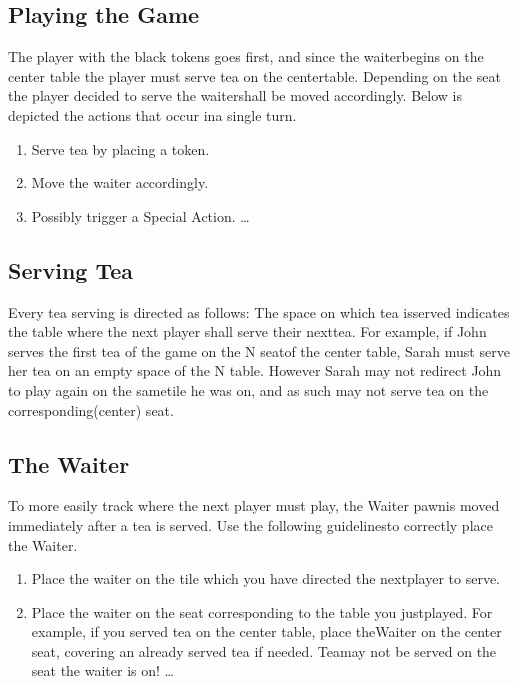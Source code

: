 \documentclass[a4paper]{article}
\begin{document}
\subsection{Playing​ ​the​ ​Game}
The​ ​player​ ​with​ ​the​ ​black​ ​tokens​ ​goes​ ​first,​ ​and​ ​since​ ​the​ ​waiter​ ​begins​ ​on​ ​the​ ​center​ ​table
the​ ​player​ ​must​ ​serve​ ​tea​ ​on​ ​the​ ​center​ ​table.​ ​Depending​ ​on​ ​the​ ​seat​ ​the​ ​player​ ​decided​ ​to​ ​serve
the​ ​waiter​ ​shall​ ​be​ ​moved​ ​accordingly.​ ​Below​ ​is​ ​depicted​ ​the​ ​actions​ ​that​ ​occur​ ​in​ ​a​ ​single​ ​turn.
\begin{enumerate}
\item Serve​ ​tea​ ​by​ ​placing​ ​a​ ​token.
\item Move​ ​the​ ​waiter​ ​accordingly.
\item Possibly​ ​trigger​ ​a​ ​Special​ ​Action. \ldots
\end{enumerate}

\subsection{Serving​ ​Tea}
Every​ ​tea​ ​serving​ ​is​ ​directed​ ​as​ ​follows:​ ​The​ ​space​ ​on​ ​which​ ​tea​ ​is​ ​served​ ​indicates​ ​the
table​ ​where​ ​the​ ​next​ ​player​ ​shall​ ​serve​ ​their​ ​next​ ​tea.​ ​For​ ​example,​ ​if​ ​John​ ​serves​ ​the​ ​first​ ​tea​ ​of
the​ ​game​ ​on​ ​the​ ​N​ ​seat​ ​of​ ​the​ ​center​ ​table,​ ​Sarah​ ​must​ ​serve​ ​her​ ​tea​ ​on​ ​an​ ​empty​ ​space​ ​of​ ​the​ ​N
table.​ ​However​ ​Sarah​ ​may​ ​not​ ​redirect​ ​John​ ​to​ ​play​ ​again​ ​on​ ​the​ ​same​ ​tile​ ​he​ ​was​ ​on,​ ​and​ ​as​ ​such
may​ ​not​ ​serve​ ​tea​ ​on​ ​the​ ​corresponding​ ​(center)​ ​seat.

\subsection{The​ ​Waiter}
To​ ​more​ ​easily​ ​track​ ​where​ ​the​ ​next​ ​player​ ​must​ ​play,​ ​the​ ​Waiter​ ​pawn​ ​is​ ​moved
immediately​ ​after​ ​a​ ​tea​ ​is​ ​served.​ ​Use​ ​the​ ​following​ ​guidelines​ ​to​ ​correctly​ ​place​ ​the​ ​Waiter.

\begin{enumerate}
\item Place​ ​the​ ​waiter​ ​on​ ​the​ ​tile​ ​which​ ​you​ ​have​ ​directed​ ​the​ ​next​ ​player​ ​to​ ​serve.
\item Place​ ​the​ ​waiter​ ​on​ ​the​ ​seat​ ​corresponding​ ​to​ ​the​ ​table​ ​you​ ​just​ ​played.​ ​For​ ​example,​ ​if
you​ ​served​ ​tea​ ​on​ ​the​ ​center​ ​table,​ ​place​ ​the​ ​Waiter​ ​on​ ​the​ ​center​ ​seat,​ ​covering​ ​an
already​ ​served​ ​tea​ ​if​ ​needed.​ ​Tea​ ​may​ ​not​ ​be​ ​served​ ​on​ ​the​ ​seat​ ​the​ ​waiter​ ​is​ ​on! \ldots
\end{enumerate}
\end{document}
